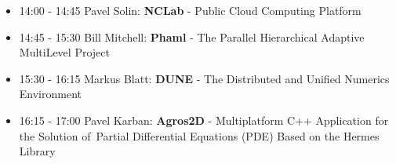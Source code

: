 \documentclass[10pt, A4]{article}%
\begin{document}
\begin{itemize}
  \begin{itemize}
    \item 14:00 - 14:45 Pavel Solin: {\bf NCLab} - Public Cloud Computing Platform
    \item 14:45 - 15:30 Bill Mitchell: {\bf Phaml} - The Parallel Hierarchical Adaptive MultiLevel Project
    \item 15:30 - 16:15 Markus Blatt: {\bf DUNE} - The Distributed and Unified Numerics Environment
    \item 16:15 - 17:00 Pavel Karban: {\bf Agros2D} - Multiplatform C++ Application for the Solution of~Partial Differential Equations (PDE) Based on the Hermes Library  
  \end{itemize}
\end{itemize}
\end{document}
